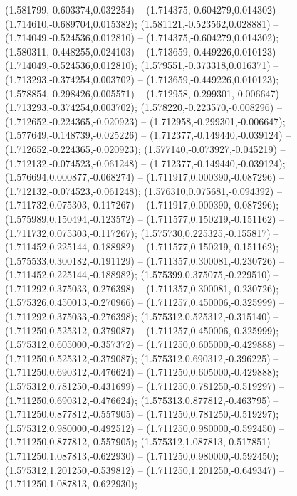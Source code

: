  (1.581799,-0.603374,0.032254) -- (1.714375,-0.604279,0.014302) -- (1.714610,-0.689704,0.015382);
 (1.581121,-0.523562,0.028881) -- (1.714049,-0.524536,0.012810) -- (1.714375,-0.604279,0.014302);
 (1.580311,-0.448255,0.024103) -- (1.713659,-0.449226,0.010123) -- (1.714049,-0.524536,0.012810);
 (1.579551,-0.373318,0.016371) -- (1.713293,-0.374254,0.003702) -- (1.713659,-0.449226,0.010123);
 (1.578854,-0.298426,0.005571) -- (1.712958,-0.299301,-0.006647) -- (1.713293,-0.374254,0.003702);
 (1.578220,-0.223570,-0.008296) -- (1.712652,-0.224365,-0.020923) -- (1.712958,-0.299301,-0.006647);
 (1.577649,-0.148739,-0.025226) -- (1.712377,-0.149440,-0.039124) -- (1.712652,-0.224365,-0.020923);
 (1.577140,-0.073927,-0.045219) -- (1.712132,-0.074523,-0.061248) -- (1.712377,-0.149440,-0.039124);
 (1.576694,0.000877,-0.068274) -- (1.711917,0.000390,-0.087296) -- (1.712132,-0.074523,-0.061248);
 (1.576310,0.075681,-0.094392) -- (1.711732,0.075303,-0.117267) -- (1.711917,0.000390,-0.087296);
 (1.575989,0.150494,-0.123572) -- (1.711577,0.150219,-0.151162) -- (1.711732,0.075303,-0.117267);
 (1.575730,0.225325,-0.155817) -- (1.711452,0.225144,-0.188982) -- (1.711577,0.150219,-0.151162);
 (1.575533,0.300182,-0.191129) -- (1.711357,0.300081,-0.230726) -- (1.711452,0.225144,-0.188982);
 (1.575399,0.375075,-0.229510) -- (1.711292,0.375033,-0.276398) -- (1.711357,0.300081,-0.230726);
 (1.575326,0.450013,-0.270966) -- (1.711257,0.450006,-0.325999) -- (1.711292,0.375033,-0.276398);
 (1.575312,0.525312,-0.315140) -- (1.711250,0.525312,-0.379087) -- (1.711257,0.450006,-0.325999);
 (1.575312,0.605000,-0.357372) -- (1.711250,0.605000,-0.429888) -- (1.711250,0.525312,-0.379087);
 (1.575312,0.690312,-0.396225) -- (1.711250,0.690312,-0.476624) -- (1.711250,0.605000,-0.429888);
 (1.575312,0.781250,-0.431699) -- (1.711250,0.781250,-0.519297) -- (1.711250,0.690312,-0.476624);
 (1.575313,0.877812,-0.463795) -- (1.711250,0.877812,-0.557905) -- (1.711250,0.781250,-0.519297);
 (1.575312,0.980000,-0.492512) -- (1.711250,0.980000,-0.592450) -- (1.711250,0.877812,-0.557905);
 (1.575312,1.087813,-0.517851) -- (1.711250,1.087813,-0.622930) -- (1.711250,0.980000,-0.592450);
 (1.575312,1.201250,-0.539812) -- (1.711250,1.201250,-0.649347) -- (1.711250,1.087813,-0.622930);

